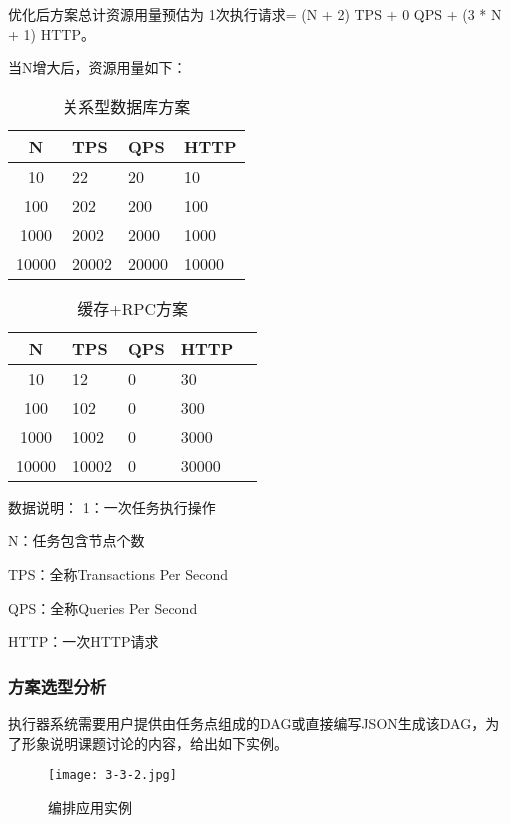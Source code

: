 优化后方案总计资源用量预估为 1次执行请求= (N + 2) TPS + 0 QPS + (3 * N + 1) HTTP。

当N增大后，资源用量如下：
\begin{table}[H]
    \centering
    \caption{关系型数据库方案}
    \label{tab:old_status_resource}
    \begin{tabular}{clll}
        \toprule
        N	&TPS	&QPS	&HTTP \\
        \midrule
        10	    &22	    &20	    &10 \\
        100	    &202    &200	&100 \\
        1000	&2002	&2000	&1000 \\
        10000	&20002	&20000	&10000 \\
        \bottomrule
    \end{tabular}
\end{table}

\begin{table}[H]
    \centering
    \caption{缓存+RPC方案}
    \label{tab:new_status_resource}
    \begin{tabular}{cllll}
        \toprule
        N	&TPS	&QPS	&HTTP \\
        \midrule
        10	    &12  &0  &30 \\
        100	    &102  &0	&300 \\
        1000	&1002  &0	&3000 \\
        10000	&10002  &0	&30000 \\
        \bottomrule
    \end{tabular}
\end{table}

数据说明：
1：一次任务执行操作

N：任务包含节点个数

TPS：全称Transactions Per Second

QPS：全称Queries Per Second

HTTP：一次HTTP请求


\subsubsection{方案选型分析}
执行器系统需要用户提供由任务点组成的DAG或直接编写JSON生成该DAG，为了形象说明课题讨论的内容，给出如下实例。

\begin{figure}[H]
    \centering
    \texttt{[image: 3-3-2.jpg]}
    \caption{编排应用实例}
    \label{fig:编排应用实例}
\end{figure}

